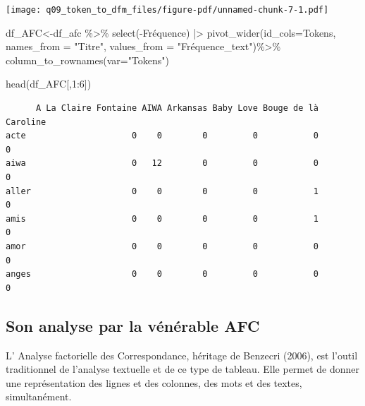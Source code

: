 \documentclass[
  letterpaper,
  DIV=11,
  numbers=noendperiod]{scrreprt}
\newenvironment{Shaded}{\begin{snugshade}}{\end{snugshade}}
\newcommand{\AttributeTok}[1]{\textcolor[rgb]{0.40,0.45,0.13}{#1}}
\newcommand{\DecValTok}[1]{\textcolor[rgb]{0.68,0.00,0.00}{#1}}
\newcommand{\FunctionTok}[1]{\textcolor[rgb]{0.28,0.35,0.67}{#1}}
\newcommand{\NormalTok}[1]{\textcolor[rgb]{0.00,0.23,0.31}{#1}}
\newcommand{\OtherTok}[1]{\textcolor[rgb]{0.00,0.23,0.31}{#1}}
\newcommand{\SpecialCharTok}[1]{\textcolor[rgb]{0.37,0.37,0.37}{#1}}
\newcommand{\StringTok}[1]{\textcolor[rgb]{0.13,0.47,0.30}{#1}}
\begin{document}
\texttt{[image: q09\_token\_to\_dfm\_files/figure-pdf/unnamed-chunk-7-1.pdf]}

\begin{Shaded}
\begin{Highlighting}[]
\NormalTok{df\_AFC}\OtherTok{\textless{}{-}}\NormalTok{df\_afc }\SpecialCharTok{\%\textgreater{}\%}
  \FunctionTok{select}\NormalTok{(}\SpecialCharTok{{-}}\NormalTok{Fréquence) }\SpecialCharTok{|\textgreater{}}
  \FunctionTok{pivot\_wider}\NormalTok{(}\AttributeTok{id\_cols=}\NormalTok{Tokens, }\AttributeTok{names\_from =} \StringTok{"Titre"}\NormalTok{, }\AttributeTok{values\_from =} \StringTok{"Fréquence\_text"}\NormalTok{)}\SpecialCharTok{\%\textgreater{}\%}
  \FunctionTok{column\_to\_rownames}\NormalTok{(}\AttributeTok{var=}\StringTok{"Tokens"}\NormalTok{)}

\FunctionTok{head}\NormalTok{(df\_AFC[,}\DecValTok{1}\SpecialCharTok{:}\DecValTok{6}\NormalTok{])}
\end{Highlighting}
\end{Shaded}

\begin{verbatim}
      A La Claire Fontaine AIWA Arkansas Baby Love Bouge de là Caroline
acte                     0    0        0         0           0        0
aiwa                     0   12        0         0           0        0
aller                    0    0        0         0           1        0
amis                     0    0        0         0           1        0
amor                     0    0        0         0           0        0
anges                    0    0        0         0           0        0
\end{verbatim}

\subsection{Son analyse par la vénérable
AFC}\label{son-analyse-par-la-vuxe9nuxe9rable-afc}

L' Analyse factorielle des Correspondance, héritage de Benzecri (2006),
est l'outil traditionnel de l'analyse textuelle et de ce type de
tableau. Elle permet de donner une représentation des lignes et des
colonnes, des mots et des textes, simultanément.
\end{document}
